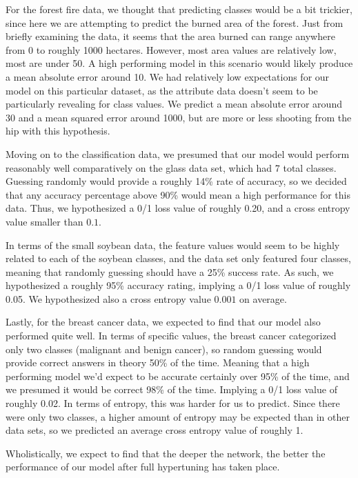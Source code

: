 \documentclass[twoside,11pt]{article}
\begin{document}
  For the forest fire data, we thought that predicting classes would be a bit trickier, since here we are attempting to predict the burned area of the forest.
  Just from briefly examining the data, it seems that the area burned can range anywhere from 0 to roughly 1000 hectares. However, most area values are relatively low,
  most are under 50. A high performing model in this scenario would likely produce a mean absolute error around 10. We had relatively low expectations for our model on
  this particular dataset, as the attribute data doesn't seem to be particularly revealing for class values. We predict a mean absolute error around 30 and a mean squared
  error around 1000, but are more or less shooting from the hip with this hypothesis. 

  Moving on to the classification data, we presumed that our model would perform reasonably well comparatively on the glass data set, which had 7 total classes. Guessing
  randomly would provide a roughly 14\% rate of accuracy, so we decided that any accuracy percentage above 90\% would mean a high performance for this data. Thus, we 
  hypothesized a 0/1 loss value of roughly 0.20, and a cross entropy value smaller than $0.1$. 

  In terms of the small soybean data, the feature values would seem to be highly related to each of the soybean classes, and the data set only featured four classes,
  meaning that randomly guessing should have a 25\% success rate. As such, we hypothesized a roughly 95\% accuracy rating, implying a 0/1 loss value of roughly
  0.05. We hypothesized also a cross entropy value $0.001$ on average.

  Lastly, for the breast cancer data, we expected to find that our model also performed quite well. In terms of specific values, the breast cancer categorized
  only two classes (malignant and benign cancer), so random guessing would provide correct answers in theory 50\% of the time. Meaning that a high performing model
  we'd expect to be accurate certainly over 95\% of the time, and we presumed it would be correct 98\% of the time. Implying a 0/1 loss value of roughly 0.02. In terms of
  entropy, this was harder for us to predict. Since there were only two classes, a higher amount of entropy may be expected than in other data sets, so we predicted
  an average cross entropy value of roughly 1.

  Wholistically, we expect to find that the deeper the network, the better the performance of our model after full hypertuning has taken place.
\end{document}
